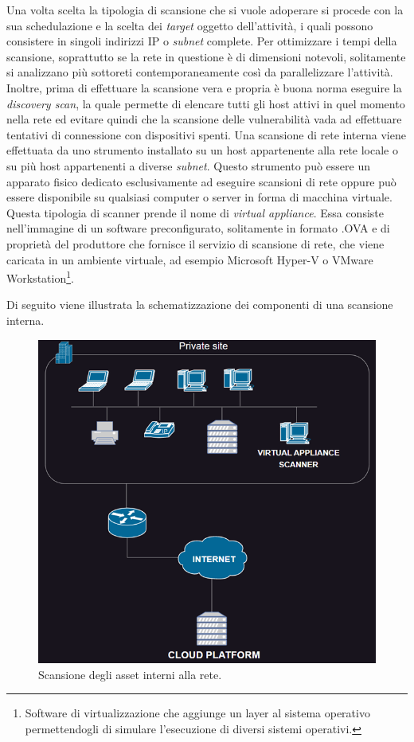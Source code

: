 \documentclass[target=bach,aauheader=]{thud}
\begin{document}
Una volta scelta la tipologia di scansione che si vuole adoperare si procede con la sua schedulazione e la scelta dei \textit{target} oggetto dell’attività, i quali possono consistere in singoli indirizzi IP o \textit{subnet} complete. Per ottimizzare i tempi della scansione, soprattutto se la rete in questione è di dimensioni notevoli, solitamente si analizzano più sottoreti contemporaneamente così da parallelizzare l’attività. Inoltre, prima di effettuare la scansione vera e propria è buona norma eseguire la \textit{discovery scan}, la quale permette di elencare tutti gli host attivi in quel momento nella rete ed evitare quindi che la scansione delle vulnerabilità vada ad effettuare tentativi di connessione con dispositivi spenti.
Una scansione di rete interna viene effettuata da uno strumento installato su un host appartenente alla rete locale o su più host appartenenti a diverse \textit{subnet}. Questo strumento può essere un apparato fisico dedicato esclusivamente ad eseguire scansioni di rete oppure può essere disponibile su qualsiasi computer o server in forma di macchina virtuale. Questa tipologia di scanner prende il nome di \textit{virtual appliance}. Essa consiste nell’immagine di un software preconfigurato, solitamente in formato .OVA e di proprietà del produttore che fornisce il servizio di scansione di rete, che viene caricata in un ambiente virtuale, ad esempio Microsoft Hyper-V o VMware Workstation\footnote{Software di virtualizzazione che aggiunge un layer al sistema operativo permettendogli di simulare l’esecuzione di diversi sistemi operativi.}.

Di seguito viene illustrata la schematizzazione dei componenti di una scansione interna.

\begin{figure}[h]
\label{fig:scan_interna}
\centering
\includegraphics{images/scan_interna.png}
    \caption{Scansione degli asset interni alla rete.}
\end{figure}
\end{document}
